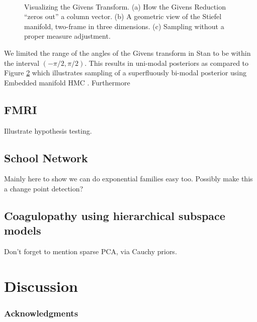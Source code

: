 \documentclass{article}
\begin{document}
\begin{figure}
\begin{subfigure}[b]{0.3\textwidth}
        \caption{}
        \label{fig:SyntheticPosteriorEstimates}
    \end{subfigure}
    ~ %
    \begin{subfigure}[b]{0.3\textwidth}
        \caption{}
        \label{fig:MultiModal}
    \end{subfigure}
    \caption{Visualizing the Givens Transform. (a) How the Givens Reduction ``zeros out'' a column vector. (b) A geometric view of the Stiefel manifold, two-frame in three dimensions. (c) Sampling without a proper measure adjustment.}\label{fig:Givens}
\end{figure}

We limited the range of the angles of the Givens transform in Stan to be within the interval $(-\pi/2, \pi/2)$. This results in uni-modal posteriors as compared to Figure \ref{fig:MultiModal} which illustrates sampling of a superfluously bi-modal posterior using Embedded manifold HMC \citep{byrne2013geodesic}. Furthermore 

\subsection{FMRI}
Illustrate hypothesis testing.

\subsection{School Network}
Mainly here to show we can do exponential families easy too. Possibly make this a change point detection?

\subsection{Coagulopathy using hierarchical subspace models}
Don't forget to mention sparse PCA, via Cauchy priors.

\section{Discussion}

\subsubsection*{Acknowledgments}
\end{document}
